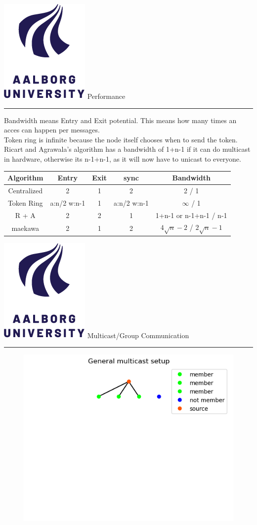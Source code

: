 \documentclass[aspectratio=1610,17pt,utf8]{beamer}
\newcommand{\mainframe}[1]{\color{blue} \includegraphics[width=.05\textwidth]{figures/aau.png} #1\\\hrule}
\newcommand{\regularframe}[1]{\color{black}\includegraphics[width=.05\textwidth]{figures/aau.png} #1\\\hrule}
\begin{document}
\begin{frame}{\regularframe{Performance}}
    Bandwidth means Entry and Exit potential. This means how many times an acces can happen per messages.\\
    Token ring is infinite because the node itself chooses when to send the token.\\
    Ricart and Agrawala's algorithm has a bandwidth of 1+n-1 if it can do multicast in hardware, otherwise its n-1+n-1, as it will now have to unicast to everyone.
    \tiny{\begin{table}
        \begin{tabular}{|c|c|c|c|c|}
            \hline
            Algorithm & Entry & Exit & sync & Bandwidth \\\hline
            Centralized & 2 & 1 & 2 & 2 / 1 \\\hline
            Token Ring & a:n/2 w:n-1 & 1 & a:n/2 w:n-1 & $\infty$ / 1 \\\hline
            R + A & 2 & 2 & 1 & 1+n-1 or n-1+n-1 / n-1 \\\hline
            maekawa & 2 & 1 & 2 & $4 \sqrt{n}-2$ / $2 \sqrt{n}-1$ \\\hline
        \end{tabular}
    \end{table}}
\end{frame}

\begin{frame}{\mainframe{Multicast/Group Communication}}

    \begin{figure}
        \includegraphics[width=1\textwidth]{figures/2-multicast-group.png}
    \end{figure}
\end{frame}
\end{document}
